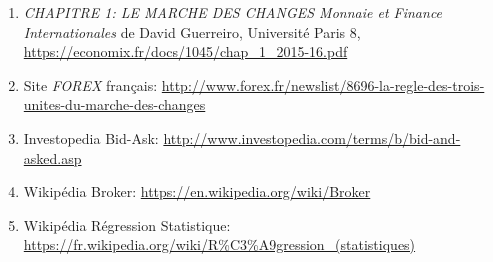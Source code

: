 \documentclass[a4paper, 11pt]{article}
\begin{document}
\begin{enumerate}
\item \textit{CHAPITRE 1: LE MARCHE DES CHANGES Monnaie et Finance Internationales} de David Guerreiro, Université Paris 8, \url{https://economix.fr/docs/1045/chap_1_2015-16.pdf} \label{marche des changes}
\item Site \textit{FOREX} français: \url{http://www.forex.fr/newslist/8696-la-regle-des-trois-unites-du-marche-des-changes} \label{site fr forex}
\item Investopedia Bid-Ask: \url{http://www.investopedia.com/terms/b/bid-and-asked.asp} \label{investopedia bid ask}
\item Wikipédia Broker: \url{https://en.wikipedia.org/wiki/Broker} \label{wikipedia broker}
\item Wikipédia Régression Statistique: \url{https://fr.wikipedia.org/wiki/R\%C3\%A9gression_(statistiques)} \label{wikipedia régression}
\end{enumerate}
\end{document}
